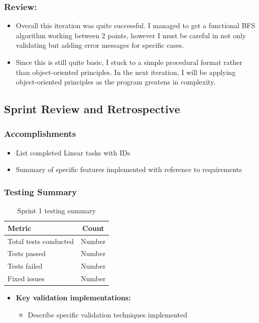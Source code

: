 \subsubsection{Review:}
\begin{itemize}
    \item Overall this iteration was quite successful. I managed to get a functional BFS algorithm working between 2 points, however I must be careful in not only validating but adding error messages for specific cases.
    \item Since this is still quite basic, I stuck to a simple procedural format rather than object-oriented principles. In the next iteration, I will be applying object-oriented principles as the program greatens in complexity.
\end{itemize}


\clearpage
\subsection{Sprint Review and Retrospective}

\subsubsection{Accomplishments}
\begin{itemize}
    \item List completed Linear tasks with IDs
    \item Summary of specific features implemented with reference to requirements
\end{itemize}

\subsubsection{Testing Summary}
\begin{table}[htbp]
\centering
\begin{tabular}{|l|c|}
\hline
\textbf{Metric} & \textbf{Count} \\
\hline
Total tests conducted & Number \\
\hline
Tests passed & Number \\
\hline
Tests failed & Number \\
\hline
Fixed issues & Number \\
\hline
\end{tabular}
\caption{Sprint 1 testing summary}
\end{table}

\begin{itemize}
    \item \textbf{Key validation implementations:}
    \begin{itemize}
        \item Describe specific validation techniques implemented
    \end{itemize}
\end{itemize}

